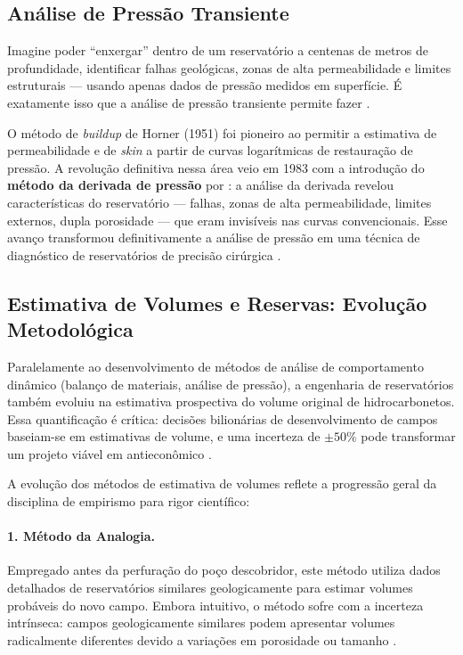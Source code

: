 \documentclass[
  12pt,
  a4paper,
  oneside,
  brazilian,
  sumario=tradicional
]{abntex2}
\begin{document}
\subsection{Análise de Pressão Transiente}

Imagine poder ``enxergar'' dentro de um reservatório a centenas de
metros de profundidade, identificar falhas geológicas, zonas de alta
permeabilidade e limites estruturais — usando apenas dados de pressão
medidos em superfície. É exatamente isso que a análise de pressão
transiente permite fazer \cite{dake2014}.

O método de \textit{buildup} de Horner (1951) foi pioneiro ao permitir
a estimativa de permeabilidade e de \textit{skin} a partir de curvas
logarítmicas de restauração de pressão. A revolução definitiva nessa
área veio em 1983 com a introdução do \textbf{método da derivada de
pressão} por \cite{bourdet1989}: a análise da derivada revelou
características do reservatório — falhas, zonas de alta permeabilidade,
limites externos, dupla porosidade — que eram invisíveis nas curvas
convencionais. Esse avanço transformou definitivamente a análise de
pressão em uma técnica de diagnóstico de reservatórios de precisão
cirúrgica \cite{dake2014}.

\subsection{Estimativa de Volumes e Reservas: Evolução Metodológica}

Paralelamente ao desenvolvimento de métodos de análise de comportamento
dinâmico (balanço de materiais, análise de pressão), a engenharia de
reservatórios também evoluiu na estimativa prospectiva do volume original
de hidrocarbonetos. Essa quantificação é crítica: decisões bilionárias
de desenvolvimento de campos baseiam-se em estimativas de volume, e uma
incerteza de $\pm 50\%$ pode transformar um projeto viável em
antieconômico \cite{rosa2006}.

A evolução dos métodos de estimativa de volumes reflete a progressão
geral da disciplina de empirismo para rigor científico:

\paragraph{1. Método da Analogia.}
Empregado antes da perfuração do poço descobridor, este método utiliza
dados detalhados de reservatórios similares geologicamente para estimar
volumes probáveis do novo campo. Embora intuitivo, o método sofre com a
incerteza intrínseca: campos geologicamente similares podem apresentar
volumes radicalmente diferentes devido a variações em porosidade ou
tamanho \cite{rosa2006}.
\end{document}
